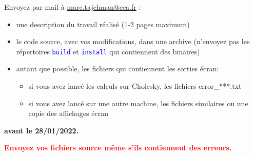 \documentclass{beamer}
\begin{document}
\begin{frame}
\bigskip
Envoyez par mail à \href{mailto:marc.tajchman@cea.fr}{marc.tajchman@cea.fr} :

\begin{itemize}
	\item une description du travail réalisé (1-2 pages maximum)
	\item le code source, avec vos modifications, dans une archive
	(n'envoyez pas les répertoires \textcolor{blue}{\tt build} et  \textcolor{blue}{\tt install} qui contiennent des binaires) 
	\item autant que possible, les fichiers qui contiennent les sorties écran:
	\begin{itemize}
		\item si vous avez lancé les calculs sur Cholesky, les fichiers error\_***.txt
	    \item si vous avez lancé sur une autre machine, les fichiers similaires ou une copie des affichages  écran
	\end{itemize}
\end{itemize}

\bigskip

{\bf avant le 28/01/2022.}

\bigskip
\textcolor{red}{\bf Envoyez vos fichiers source même s'ils contiennent des erreurs.}
\end{frame}
\end{document}
